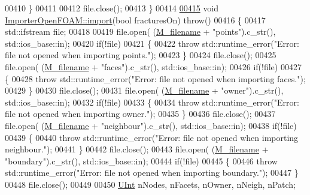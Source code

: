 \begin{DoxyCode}
00410     \}
00411 
00412     file.close();
00413 \}
00414 
\hypertarget{Import_8cpp_source.tex_l00415}{}\hyperlink{classFVCode3D_1_1ImporterOpenFOAM_ac8d43d9c6d007f5637e5878cef77df5e}{00415} \textcolor{keywordtype}{void} \hyperlink{classFVCode3D_1_1ImporterOpenFOAM_ac8d43d9c6d007f5637e5878cef77df5e}{ImporterOpenFOAM::import}(\textcolor{keywordtype}{bool} fracturesOn) \textcolor{keywordflow}{throw}()
00416 \{
00417     std::ifstream file;
00418 
00419     file.open( (\hyperlink{classFVCode3D_1_1Importer_a318e689fb93c5c906f85aa13685724d7}{M\_filename} + \textcolor{stringliteral}{"points"}).c\_str(), std::ios\_base::in);
00420     \textcolor{keywordflow}{if}(!file)
00421     \{
00422         \textcolor{keywordflow}{throw} std::runtime\_error(\textcolor{stringliteral}{"Error: file not opened when importing points."});
00423     \}
00424     file.close();
00425     file.open( (\hyperlink{classFVCode3D_1_1Importer_a318e689fb93c5c906f85aa13685724d7}{M\_filename} + \textcolor{stringliteral}{"faces"}).c\_str(), std::ios\_base::in);
00426     \textcolor{keywordflow}{if}(!file)
00427     \{
00428         \textcolor{keywordflow}{throw} std::runtime\_error(\textcolor{stringliteral}{"Error: file not opened when importing faces."});
00429     \}
00430     file.close();
00431     file.open( (\hyperlink{classFVCode3D_1_1Importer_a318e689fb93c5c906f85aa13685724d7}{M\_filename} + \textcolor{stringliteral}{"owner"}).c\_str(), std::ios\_base::in);
00432     \textcolor{keywordflow}{if}(!file)
00433     \{
00434         \textcolor{keywordflow}{throw} std::runtime\_error(\textcolor{stringliteral}{"Error: file not opened when importing owner."});
00435     \}
00436     file.close();
00437     file.open( (\hyperlink{classFVCode3D_1_1Importer_a318e689fb93c5c906f85aa13685724d7}{M\_filename} + \textcolor{stringliteral}{"neighbour"}).c\_str(), std::ios\_base::in);
00438     \textcolor{keywordflow}{if}(!file)
00439     \{
00440         \textcolor{keywordflow}{throw} std::runtime\_error(\textcolor{stringliteral}{"Error: file not opened when importing neighbour."});
00441     \}
00442     file.close();
00443     file.open( (\hyperlink{classFVCode3D_1_1Importer_a318e689fb93c5c906f85aa13685724d7}{M\_filename} + \textcolor{stringliteral}{"boundary"}).c\_str(), std::ios\_base::in);
00444     \textcolor{keywordflow}{if}(!file)
00445     \{
00446         \textcolor{keywordflow}{throw} std::runtime\_error(\textcolor{stringliteral}{"Error: file not opened when importing boundary."});
00447     \}
00448     file.close();
00449 
00450     \hyperlink{namespaceFVCode3D_a4bf7e328c75d0fd504050d040ebe9eda}{UInt} nNodes, nFacets, nOwner, nNeigh, nPatch;

\end{DoxyCode}
